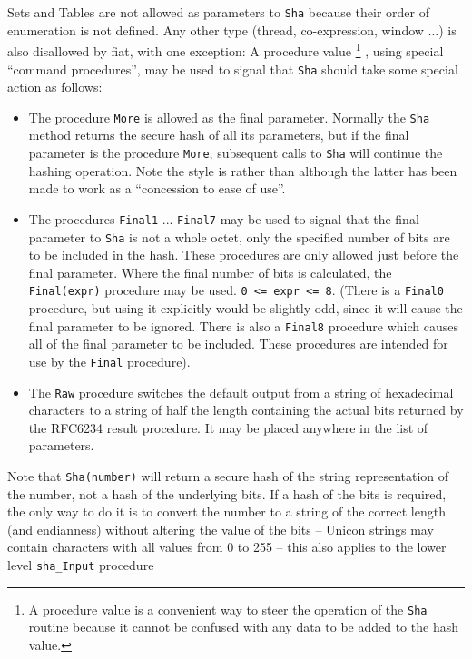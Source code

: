 Sets and Tables are not allowed as parameters to \texttt{Sha} because their order of
enumeration is not defined. Any other type (thread, co-expression, window ...)
is also disallowed by fiat, with one exception: A procedure value%
\footnote{
A procedure value is a convenient way to steer the operation of the
\texttt{Sha} routine because it cannot be confused with any data to be added to
the hash value.}%
, using special ``command procedures'', may be used to signal that \texttt{Sha}
should take some special action as follows:
\begin{itemize}
  \item
    The procedure \texttt{More} is allowed as the final parameter. Normally the
    \texttt{Sha} method returns the secure hash of all its parameters, but if
    the final parameter is the procedure \texttt{More}, subsequent calls to
    \texttt{Sha} will continue the hashing operation.
    Note the style is
\noindent rather than
\noindent although the latter has been made to work as a ``concession to ease of use''.

\item
  The procedures \texttt{Final1} ... \texttt{Final7} may be used to signal that
  the final parameter to \texttt{Sha} is not a whole octet, only the specified
  number of bits are to be included in the hash. These procedures are only
  allowed just before the final parameter.  Where the final number of bits is
  calculated, the \texttt{Final(expr)} procedure may be
  used. \verb|0 <= expr <= 8|. (There is a \texttt{Final0} procedure, but using
  it explicitly would be slightly odd, since it will cause the final parameter
  to be ignored. There is also a \texttt{Final8} procedure which causes all of
  the final parameter to be included. These procedures are intended for use by
  the \texttt{Final} procedure).

\item
  The \texttt{Raw} procedure switches the default output from a string of
  hexadecimal characters to a string of half the length containing the actual
  bits returned by the RFC6234 result procedure. It may be placed anywhere in
  the list of parameters.
\end{itemize}

Note that \texttt{Sha(number)} will return a secure hash of the string
representation of the number, not a hash of the underlying bits. If a hash of
the bits is required, the only way to do it is to convert the number to a string
of the correct length (and endianness) without altering the value of the bits
-- Unicon strings may contain characters with all values from 0 to 255 -- this
also applies to the lower level \texttt{sha\_Input} procedure

